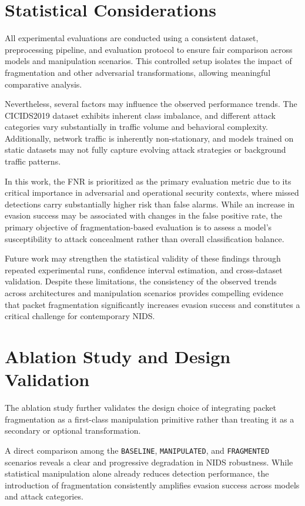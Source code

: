 \section{Statistical Considerations}

All experimental evaluations are conducted using a consistent dataset, preprocessing pipeline, and evaluation protocol to ensure fair comparison across models and manipulation scenarios. This controlled setup isolates the impact of fragmentation and other adversarial transformations, allowing meaningful comparative analysis.

Nevertheless, several factors may influence the observed performance trends. The CICIDS2019 dataset exhibits inherent class imbalance, and different attack categories vary substantially in traffic volume and behavioral complexity. Additionally, network traffic is inherently non-stationary, and models trained on static datasets may not fully capture evolving attack strategies or background traffic patterns.

In this work, the FNR is prioritized as the primary evaluation metric due to its critical importance in adversarial and operational security contexts, where missed detections carry substantially higher risk than false alarms. While an increase in evasion success may be associated with changes in the false positive rate, the primary objective of fragmentation-based evaluation is to assess a model’s susceptibility to attack concealment rather than overall classification balance.

Future work may strengthen the statistical validity of these findings through repeated experimental runs, confidence interval estimation, and cross-dataset validation. Despite these limitations, the consistency of the observed trends across architectures and manipulation scenarios provides compelling evidence that packet fragmentation significantly increases evasion success and constitutes a critical challenge for contemporary NIDS.

\section{Ablation Study and Design Validation}

The ablation study further validates the design choice of integrating packet fragmentation as a first-class manipulation primitive rather than treating it as a secondary or optional transformation.

A direct comparison among the \texttt{BASELINE}, \texttt{MANIPULATED}, and \texttt{FRAGMENTED} scenarios reveals a clear and progressive degradation in NIDS robustness. While statistical manipulation alone already reduces detection performance, the introduction of fragmentation consistently amplifies evasion success across models and attack categories.


